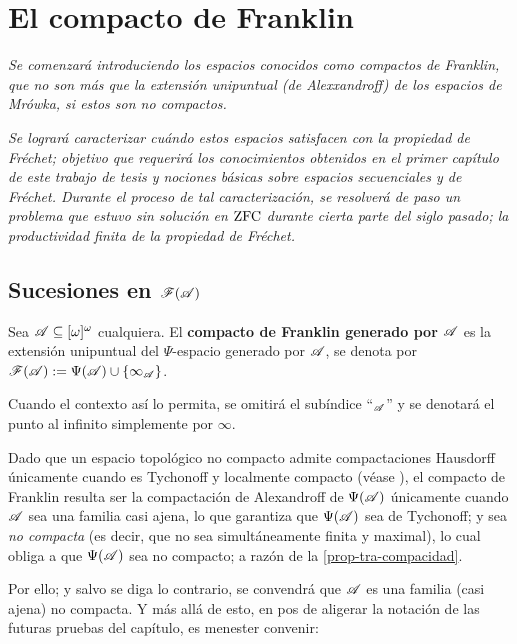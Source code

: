 \chapter{El compacto de Franklin}
\emph{\small Se comenzará introduciendo los espacios conocidos como \textit{compactos de Franklin}, que no son más que la extensión unipuntual (de Alexxandroff) de los espacios de Mrówka, si estos son no compactos.}

\emph{\small Se logrará caracterizar cuándo estos espacios satisfacen con la propiedad de Fréchet; objetivo que requerirá los conocimientos obtenidos en el primer capítulo de este trabajo de tesis y nociones básicas sobre espacios secuenciales y de Fréchet. Durante el proceso de tal caracterización, se resolverá de paso un problema que estuvo sin solución en $\operatorname{ZFC}$ durante cierta parte del siglo pasado; la productividad finita de la propiedad de Fréchet.}

\section{\texorpdfstring{Sucesiones en $\mathscr{F}(\mathscr{A})$}{Sucesiones en F(A)}}
\label{Subsec-sucesiones-Franklin}

\begin{definicion}
	Sea $\mathscr{A}\subseteq [\omega]^\omega$ cualquiera. El \textbf{compacto de Franklin generado por $\mathscr{A}$} es la extensión unipuntual del $\Psi$-espacio generado por $\mathscr{A}$, se denota por $ \mathscr{F}(\mathscr{A}):=\Psi(\mathscr{A}) \cup \{\infty_{\mathscr{A}} \} $.

	Cuando el contexto así lo permita, se omitirá el subíndice ``$_{\mathscr{A}}$'' y se denotará el punto al infinito simplemente por $\infty$.
\end{definicion}

Dado que un espacio topológico no compacto admite compactaciones Hausdorff únicamente cuando es Tychonoff y localmente compacto (véase \cite[p.~ 221]{fidelElementos}), el compacto de Franklin resulta ser la compactación de Alexandroff de $\Psi(\mathscr{A})$ únicamente cuando $\mathscr{A}$ sea una familia casi ajena, lo que garantiza que $\Psi(\mathscr{A})$ sea de Tychonoff; y sea \textit{no compacta} (es decir, que no sea simultáneamente finita y maximal), lo cual obliga a que $\Psi(\mathscr{A})$ sea no compacto; a razón de la \autoref{prop-tra-compacidad}.

Por ello; y salvo se diga lo contrario, se convendrá que $\mathscr{A}$ es una familia (casi ajena) no compacta. Y más allá de esto, en pos de aligerar la notación de las futuras pruebas del capítulo, es menester convenir:

